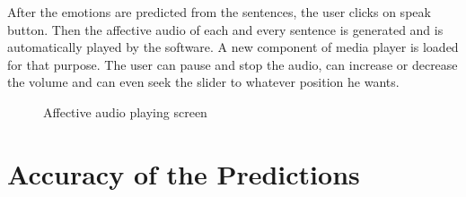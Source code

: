 \documentclass[oneside,a4paper,12pt]{book}
\begin{document}
\newpage 
After the emotions are predicted from the sentences, the user clicks on speak button. Then the affective audio of each and every sentence is generated and is automatically played by the software. A new component of media player is loaded for that purpose. The user can pause and stop the audio, can increase or decrease the volume and can even seek the slider to whatever position he wants.
  \begin{center}
  	\begin{figure}[!htbp]
  		
  		\caption{Affective audio playing screen}
  		\label{fig:Affective Audio playing screen}
  	\end{figure}
  \end{center} 

\newpage
\section{Accuracy of the Predictions}
\end{document}
